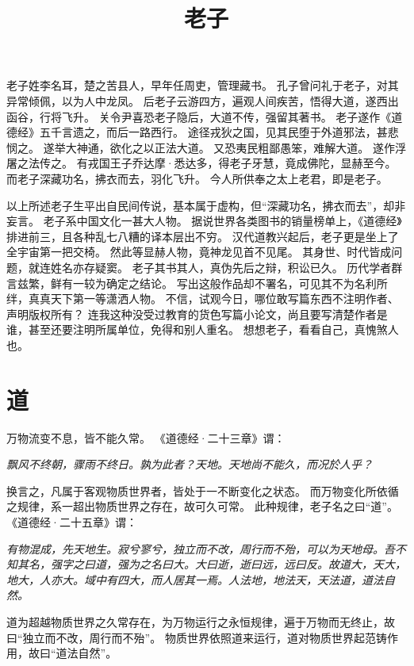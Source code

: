 \documentclass[11pt]{article}
\title{老子}
\date{}
\begin{document}
  \maketitle

  \newpage
  
  \linenumbers

老子姓李名耳，楚之苦县人，早年任周吏，管理藏书。
孔子曾问礼于老子，对其异常倾佩，以为人中龙凤。
后老子云游四方，遍观人间疾苦，悟得大道，遂西出函谷，行将飞升。
关令尹喜恐老子隐后，大道不传，强留其著书。
老子遂作《道德经》五千言遗之，而后一路西行。
途径戎狄之国，见其民堕于外道邪法，甚悲悯之。
遂举大神通，欲化之以正法大道。
又恐夷民粗鄙愚笨，难解大道。
遂作浮屠之法传之。
有戎国王子乔达摩·悉达多，得老子牙慧，竟成佛陀，显赫至今。
而老子深藏功名，拂衣而去，羽化飞升。
今人所供奉之太上老君，即是老子。

\newline

以上所述老子生平出自民间传说，基本属于虚构，但“深藏功名，拂衣而去”，却非妄言。
老子系中国文化一甚大人物。
据说世界各类图书的销量榜单上，《道德经》排进前三，且各种乱七八糟的译本层出不穷。
汉代道教兴起后，老子更是坐上了全宇宙第一把交椅。
然此等显赫人物，竟神龙见首不见尾。
其身世、时代皆成问题，就连姓名亦存疑窦。
老子其书其人，真伪先后之辩，积讼已久。
历代学者群言兹繁，鲜有一较为确定之结论。
写出这般作品却不署名，可见其不为名利所绊，真真天下第一等潇洒人物。
不信，试观今日，哪位敢写篇东西不注明作者、声明版权所有？
连我这种没受过教育的货色写篇小论文，尚且要写清楚作者是谁，甚至还要注明所属单位，免得和别人重名。
想想老子，看看自己，真愧煞人也。

\newline

\section{道}
万物流变不息，皆不能久常。
《道德经·二十三章》谓：

\textit{飘风不终朝，骤雨不终日。孰为此者？天地。天地尚不能久，而况於人乎？}

换言之，凡属于客观物质世界者，皆处于一不断变化之状态。
而万物变化所依循之规律，系一超出物质世界之存在，故可久可常。
此种规律，老子名之曰“道”。
《道德经·二十五章》谓：

\textit{有物混成，先天地生。寂兮寥兮，独立而不改，周行而不殆，可以为天地母。吾不知其名，强字之曰道，强为之名曰大。大曰逝，逝曰远，远曰反。故道大，天大，地大，人亦大。域中有四大，而人居其一焉。人法地，地法天，天法道，道法自然。}

道为超越物质世界之久常存在，为万物运行之永恒规律，遍于万物而无终止，故曰“独立而不改，周行而不殆”。
物质世界依照道来运行，道对物质世界起范铸作用，故曰“道法自然”。
\end{document}
